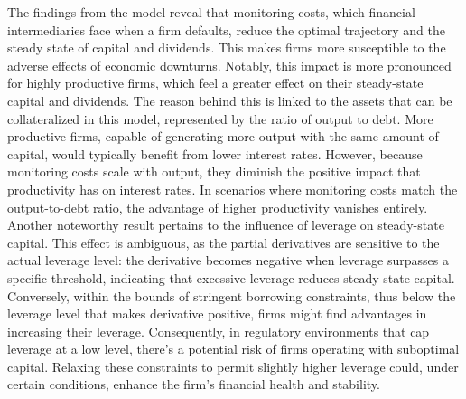 The findings from the model reveal that monitoring costs, which financial intermediaries face when a firm defaults,
reduce the optimal trajectory and the steady state of capital and dividends. This makes firms more susceptible to the
adverse effects of economic downturns. Notably, this impact is more pronounced for highly productive firms, which feel a
greater effect on their steady-state capital and dividends. The reason behind this is linked to the assets that can be
collateralized in this model, represented by the ratio of output to debt. More productive firms, capable of generating
more output with the same amount of capital, would typically benefit from lower interest rates. However, because
monitoring costs scale with output, they diminish the positive impact that productivity has on interest rates. In
scenarios where monitoring costs match the output-to-debt ratio, the advantage of higher productivity vanishes entirely. 
Another noteworthy result pertains to the influence of leverage on steady-state capital. This effect is ambiguous, as the
partial derivatives are sensitive to the actual leverage level: the derivative becomes negative when leverage surpasses
a specific threshold, indicating that excessive leverage reduces steady-state capital. Conversely, within the bounds of
stringent borrowing constraints, thus below the leverage level that makes derivative positive, firms might find advantages in increasing their leverage. Consequently, in regulatory
environments that cap leverage at a low level, there's a potential risk of firms operating with suboptimal capital.
Relaxing these constraints to permit slightly higher leverage could, under certain conditions, enhance the firm's
financial health and stability. 
